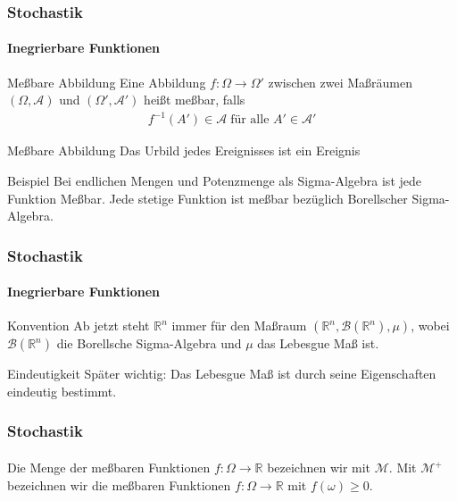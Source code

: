\documentclass{beamer}
\begin{document}
 \begin{frame}
    \frametitle{Stochastik}
\framesubtitle{Inegrierbare Funktionen}
    \begin{block}{Meßbare Abbildung}
     Eine Abbildung $f:\Omega \to \Omega'$ zwischen zwei Maßräumen 
      $(\Omega, \mathcal{A})$ und $(\Omega', \mathcal{A}')$ heißt meßbar, falls
    \begin{align*}
        f^{-1}(A') \in \mathcal{A} \; \text{für alle } A' \in \mathcal{A}'
    \end{align*}
    \end{block}

    \begin{block}{Meßbare Abbildung}
    Das Urbild jedes Ereignisses ist ein Ereignis
    \end{block}

    \begin{block}{Beispiel}
        Bei endlichen Mengen und Potenzmenge als Sigma-Algebra ist jede Funktion Meßbar.
        Jede stetige Funktion ist meßbar bezüglich Borellscher Sigma-Algebra.
    \end{block}

    
 \end{frame}

 \begin{frame}
    \frametitle{Stochastik}
\framesubtitle{Inegrierbare Funktionen}
    \begin{block}{Konvention}
        Ab jetzt steht $\mathbb{R}^n$ immer für den Maßraum
        $(\mathbb{R}^n, \mathcal{B}(\mathbb{R}^n), \mu)$, wobei $\mathcal{B}(\mathbb{R}^n)$ die Borellsche Sigma-Algebra 
        und $\mu$ das Lebesgue Maß  ist.
    \end{block}

    \begin{block}{Eindeutigkeit}
        Später wichtig: Das Lebesgue Maß ist durch seine Eigenschaften eindeutig bestimmt.
    \end{block}


\end{frame}

\begin{frame}
    \frametitle{Stochastik}
\framesubtitle{}
    \begin{block}{}
        Die Menge der meßbaren Funktionen $f: \Omega \to \mathbb{R}$ bezeichnen wir mit $\mathcal{M}$. 
        Mit $\mathcal{M}^+$ bezeichnen wir die meßbaren Funktionen $f: \Omega \to \mathbb{R}$ mit $f(\omega) \geq 0$. 
    \end{block}

\end{frame}
\end{document}
